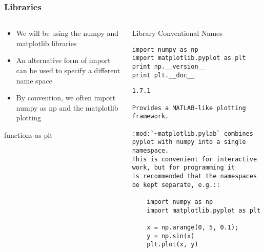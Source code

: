 \documentclass[bigger]{beamer}
\begin{document}
\begin{frame}[fragile]
\frametitle{Libraries}
\label{sec-1-13}
\begin{columns}
\begin{column}{0.4\textwidth}
\label{sec-1-13-1}

\begin{itemize}
\item We will be using the numpy and matplotlib libraries
\item An alternative form of import can be used to specify a different name space
\item By convention, we often import numpy as np and the matplotlib plotting
\end{itemize}
functions as plt
\end{column}
\begin{column}{0.6\textwidth}
\begin{block}{Library Conventional Names}
\label{sec-1-13-2}

\fontsize{6}{7.2}\selectfont

\begin{verbatim}
import numpy as np
import matplotlib.pyplot as plt
print np.__version__
print plt.__doc__
\end{verbatim}


\begin{verbatim}
1.7.1

Provides a MATLAB-like plotting framework.

:mod:`~matplotlib.pylab` combines pyplot with numpy into a single namespace.
This is convenient for interactive work, but for programming it
is recommended that the namespaces be kept separate, e.g.::

    import numpy as np
    import matplotlib.pyplot as plt

    x = np.arange(0, 5, 0.1);
    y = np.sin(x)
    plt.plot(x, y)
\end{verbatim}
\end{block}
\end{column}
\end{columns}
\end{frame}
\end{document}
